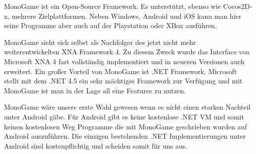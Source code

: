 MonoGame ist ein Open-Source \CS Framework. Es unterstützt, ebenso wie Cocos2D-x, mehrere Zielplattformen. Neben Windows, Android und iOS kann man hier seine Programme aber auch auf der Playstation oder XBox ausführen.

MonoGame sieht sich selbst als Nachfolger des jetzt nicht mehr weiterentwickelten \cite{XNAEND} XNA Framework 4. Zu diesem Zweck wurde das Interface von Microsoft XNA 4 fast vollständig implementiert und in neueren Versionen auch erweitert.
Ein großer Vorteil von MonoGame ist .NET Framework. Microsoft stellt mit dem .NET 4.5 ein sehr mächtiges Framework zur Verfügung und mit MonoGame ist man in der Lage all eine Features zu nutzen.

MonoGame wäre unsere erste Wahl gewesen wenn es nicht einen starken Nachteil unter Android gäbe. Für Android gibt es keine kostenlose .NET VM und somit keinen kostenlosen Weg Programme die mit MonoGame geschrieben wurden auf Android auszuführen. Die einzigen bestehenden .NET Implementierungen unter Android sind kostenpflichtig und scheiden somit für uns aus.